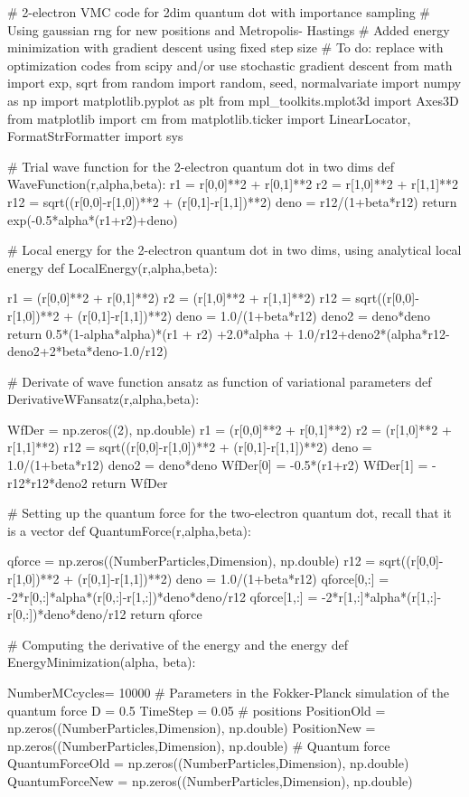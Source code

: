 \documentclass[%
oneside,                 %
final,                   %
10pt]{article}
\begin{document}
\bpycod
# 2-electron VMC code for 2dim quantum dot with importance sampling
# Using gaussian rng for new positions and Metropolis- Hastings 
# Added energy minimization with gradient descent using fixed step size
# To do: replace with optimization codes from scipy and/or use stochastic gradient descent
from math import exp, sqrt
from random import random, seed, normalvariate
import numpy as np
import matplotlib.pyplot as plt
from mpl_toolkits.mplot3d import Axes3D
from matplotlib import cm
from matplotlib.ticker import LinearLocator, FormatStrFormatter
import sys



# Trial wave function for the 2-electron quantum dot in two dims
def WaveFunction(r,alpha,beta):
    r1 = r[0,0]**2 + r[0,1]**2
    r2 = r[1,0]**2 + r[1,1]**2
    r12 = sqrt((r[0,0]-r[1,0])**2 + (r[0,1]-r[1,1])**2)
    deno = r12/(1+beta*r12)
    return exp(-0.5*alpha*(r1+r2)+deno)

# Local energy  for the 2-electron quantum dot in two dims, using analytical local energy
def LocalEnergy(r,alpha,beta):
    
    r1 = (r[0,0]**2 + r[0,1]**2)
    r2 = (r[1,0]**2 + r[1,1]**2)
    r12 = sqrt((r[0,0]-r[1,0])**2 + (r[0,1]-r[1,1])**2)
    deno = 1.0/(1+beta*r12)
    deno2 = deno*deno
    return 0.5*(1-alpha*alpha)*(r1 + r2) +2.0*alpha + 1.0/r12+deno2*(alpha*r12-deno2+2*beta*deno-1.0/r12)

# Derivate of wave function ansatz as function of variational parameters
def DerivativeWFansatz(r,alpha,beta):
    
    WfDer  = np.zeros((2), np.double)
    r1 = (r[0,0]**2 + r[0,1]**2)
    r2 = (r[1,0]**2 + r[1,1]**2)
    r12 = sqrt((r[0,0]-r[1,0])**2 + (r[0,1]-r[1,1])**2)
    deno = 1.0/(1+beta*r12)
    deno2 = deno*deno
    WfDer[0] = -0.5*(r1+r2)
    WfDer[1] = -r12*r12*deno2
    return  WfDer

# Setting up the quantum force for the two-electron quantum dot, recall that it is a vector
def QuantumForce(r,alpha,beta):

    qforce = np.zeros((NumberParticles,Dimension), np.double)
    r12 = sqrt((r[0,0]-r[1,0])**2 + (r[0,1]-r[1,1])**2)
    deno = 1.0/(1+beta*r12)
    qforce[0,:] = -2*r[0,:]*alpha*(r[0,:]-r[1,:])*deno*deno/r12
    qforce[1,:] = -2*r[1,:]*alpha*(r[1,:]-r[0,:])*deno*deno/r12
    return qforce
    

# Computing the derivative of the energy and the energy 
def EnergyMinimization(alpha, beta):

    NumberMCcycles= 10000
    # Parameters in the Fokker-Planck simulation of the quantum force
    D = 0.5
    TimeStep = 0.05
    # positions
    PositionOld = np.zeros((NumberParticles,Dimension), np.double)
    PositionNew = np.zeros((NumberParticles,Dimension), np.double)
    # Quantum force
    QuantumForceOld = np.zeros((NumberParticles,Dimension), np.double)
    QuantumForceNew = np.zeros((NumberParticles,Dimension), np.double)
\end{document}
